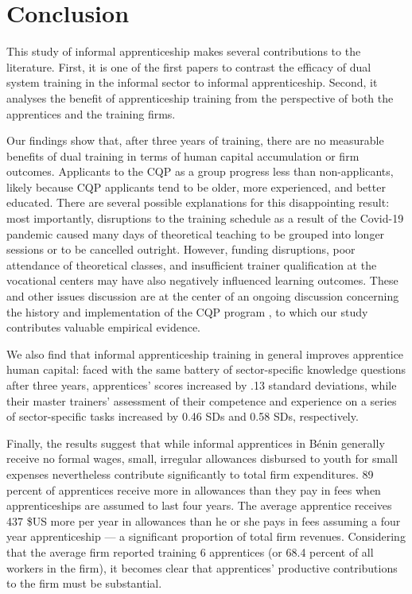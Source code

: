 \documentclass[
  a4paper, twoside, 12pt]{book}
\begin{document}
\hypertarget{conclusion}{%
\section{Conclusion}\label{conclusion}}

This study of informal apprenticeship makes several contributions to the literature. First, it is one of the first papers to contrast the efficacy of dual system training in the informal sector to informal apprenticeship. Second, it analyses the benefit of apprenticeship training from the perspective of both the apprentices and the training firms.

Our findings show that, after three years of training, there are no measurable benefits of dual training in terms of human capital accumulation or firm outcomes. Applicants to the CQP as a group progress less than non-applicants, likely because CQP applicants tend to be older, more experienced, and better educated. There are several possible explanations for this disappointing result: most importantly, disruptions to the training schedule as a result of the Covid-19 pandemic caused many days of theoretical teaching to be grouped into longer sessions or to be cancelled outright. However, funding disruptions, poor attendance of theoretical classes, and insufficient trainer qualification at the vocational centers may have also negatively influenced learning outcomes. These and other issues discussion are at the center of an ongoing discussion concerning the history and implementation of the CQP program \autocite{davodoun2011,david-gnahoui2017,bankole2020}, to which our study contributes valuable empirical evidence.

We also find that informal apprenticeship training in general improves apprentice human capital: faced with the same battery of sector-specific knowledge questions after three years, apprentices' scores increased by .13 standard deviations, while their master trainers' assessment of their competence and experience on a series of sector-specific tasks increased by 0.46 SDs and 0.58 SDs, respectively.

Finally, the results suggest that while informal apprentices in Bénin generally receive no formal wages, small, irregular allowances disbursed to youth for small expenses nevertheless contribute significantly to total firm expenditures. 89 percent of apprentices receive more in allowances than they pay in fees when apprenticeships are assumed to last four years. The average apprentice receives 437 \$US more per year in allowances than he or she pays in fees assuming a four year apprenticeship --- a significant proportion of total firm revenues. Considering that the average firm reported training 6 apprentices (or 68.4 percent of all workers in the firm), it becomes clear that apprentices' productive contributions to the firm must be substantial.
\end{document}

